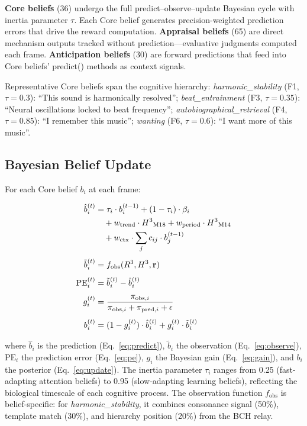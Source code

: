 \documentclass[10pt,twocolumn]{article}
\newcommand{\Rcube}{R\textsuperscript{3}}
\newcommand{\Hcube}{H\textsuperscript{3}}
\newcommand{\pe}{\mathrm{PE}}
\begin{document}
\textbf{Core beliefs} (36) undergo the full predict--observe--update Bayesian cycle with inertia parameter $\tau$.
Each Core belief generates precision-weighted prediction errors that drive the reward computation.
\textbf{Appraisal beliefs} (65) are direct mechanism outputs tracked without prediction---evaluative judgments computed each frame.
\textbf{Anticipation beliefs} (30) are forward predictions that feed into Core beliefs' predict() methods as context signals.

Representative Core beliefs span the cognitive hierarchy:
\emph{harmonic\_stability} (F1, $\tau=0.3$): ``This sound is harmonically resolved'';
\emph{beat\_entrainment} (F3, $\tau=0.35$): ``Neural oscillations locked to beat frequency'';
\emph{autobiographical\_retrieval} (F4, $\tau=0.85$): ``I remember this music'';
\emph{wanting} (F6, $\tau=0.6$): ``I want more of this music''.

\subsection{Bayesian Belief Update}

For each Core belief $b_i$ at each frame:

\vspace{-4pt}
\begin{align}
\hat{b}_i^{(t)} &= \tau_i \cdot b_i^{(t-1)} + (1-\tau_i) \cdot \beta_i \nonumber \\
& \quad + w_{\mathrm{trend}} \cdot \Hcube_{\mathrm{M18}} + w_{\mathrm{period}} \cdot \Hcube_{\mathrm{M14}} \nonumber \\
& \quad + w_{\mathrm{ctx}} \cdot \sum_j c_{ij} \cdot b_j^{(t-1)} \label{eq:predict} \\[4pt]
\tilde{b}_i^{(t)} &= f_{\mathrm{obs}}(\Rcube, \Hcube, \mathbf{r}) \label{eq:observe} \\[4pt]
\pe_i^{(t)} &= \tilde{b}_i^{(t)} - \hat{b}_i^{(t)} \label{eq:pe} \\[4pt]
g_i^{(t)} &= \frac{\pi_{\mathrm{obs},i}}{\pi_{\mathrm{obs},i} + \pi_{\mathrm{pred},i} + \epsilon} \label{eq:gain} \\[4pt]
b_i^{(t)} &= (1 - g_i^{(t)}) \cdot \hat{b}_i^{(t)} + g_i^{(t)} \cdot \tilde{b}_i^{(t)} \label{eq:update}
\end{align}
\vspace{-2pt}

where $\hat{b}_i$ is the prediction (Eq.~\ref{eq:predict}), $\tilde{b}_i$ the observation (Eq.~\ref{eq:observe}), $\pe_i$ the prediction error (Eq.~\ref{eq:pe}), $g_i$ the Bayesian gain (Eq.~\ref{eq:gain}), and $b_i$ the posterior (Eq.~\ref{eq:update}).
The inertia parameter $\tau_i$ ranges from 0.25 (fast-adapting attention beliefs) to 0.95 (slow-adapting learning beliefs), reflecting the biological timescale of each cognitive process.
The observation function $f_{\mathrm{obs}}$ is belief-specific: for \emph{harmonic\_stability}, it combines consonance signal (50\%), template match (30\%), and hierarchy position (20\%) from the BCH relay.
\end{document}
